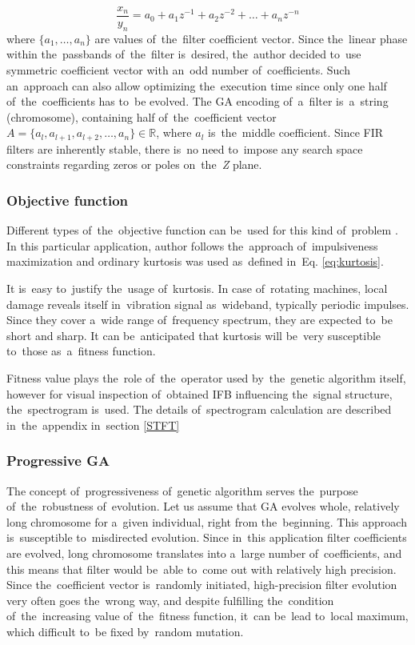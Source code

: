 \begin{equation}
\label{eq:fir}
\frac{x_n}{y_n}=a_0 + a_1 z^{-1} + a_2 z^{-2} +\dots +a_n z^{-n}
\end{equation}
where $\{a_1,\dots ,a_n \}$ are values of~the~filter coefficient vector. Since the~linear phase within the~passbands of~the~filter is~desired, the~author decided to~use symmetric coefficient vector with an~odd number of~coefficients. Such an~approach can also allow optimizing the~execution time since only one half of~the~coefficients has to~be evolved. The GA encoding of~a~filter is~a~string (chromosome), containing half of~the~coefficient vector $A=\{a_l,a_{l+1},a_{l+2},\dots,a_n\} \in \mathbb{R}$, where $a_l$ is~the~middle coefficient. Since FIR filters are inherently stable, there is~no need to~impose any search space constraints regarding zeros or poles on~the~\emph{Z} plane.

\subsubsection{Objective function}

Different types of~the~objective function can be~used for this kind of~problem \cite{mitchell1998introduction}. In this particular application, author follows the~approach of~impulsiveness maximization and ordinary kurtosis was used as~defined in~Eq. \ref{eq:kurtosis}.

It is~easy to~justify the~usage of~kurtosis. In case of~rotating machines, local damage reveals itself in~vibration signal as~wideband, typically periodic impulses. Since they cover a~wide range of~frequency spectrum, they are expected to~be short and sharp. It can be~anticipated that kurtosis will be~very susceptible to~those as~a~fitness function.

Fitness value plays the~role of~the~operator used by~the~genetic algorithm itself, however for visual inspection of~obtained IFB influencing the~signal structure, the~spectrogram is~used. 
The details of~spectrogram calculation are described in~the~appendix in~section \ref{STFT}

\subsubsection{Progressive GA} \label{pga}

The concept of~progressiveness of~genetic algorithm serves the~purpose of~the~robustness of~evolution. Let us assume that GA evolves whole, relatively long chromosome for a~given individual, right from the~beginning. This approach is~susceptible to~misdirected evolution. Since in~this application filter coefficients are evolved, long chromosome translates into a~large number of~coefficients, and this means that filter would be~able to~come out with relatively high precision. Since the~coefficient vector is~randomly initiated, high-precision filter evolution very often goes the~wrong way, and despite fulfilling the~condition of~the~increasing value of~the~fitness function, it~can be~lead to~local maximum, which difficult to~be fixed by~random mutation. 

